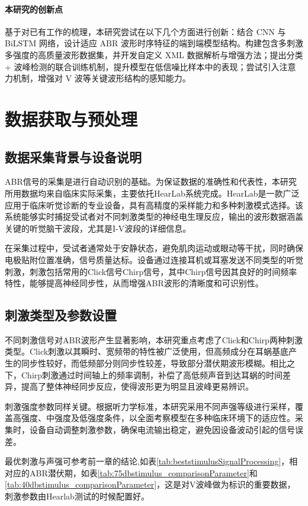 \paragraph*{本研究的创新点}
基于对已有工作的梳理，本研究尝试在以下几个方面进行创新：结合 CNN 与 BiLSTM 网络，设计适应 ABR 波形时序特征的端到端模型结构。构建包含多刺激多强度的高质量波形数据集，并开发自定义 XML 数据解析与增强方法；提出分类 + 波峰检测的联合训练机制，提升模型在低信噪比样本中的表现；尝试引入注意力机制，增强对 V 波等关键波形结构的感知能力。

\section{数据获取与预处理}
\subsection*{数据采集背景与设备说明}
ABR信号的采集是进行自动识别的基础。为保证数据的准确性和代表性，本研究所用数据均来自临床实际采集，主要依托HearLab系统完成。HearLab是一款广泛应用于临床听觉诊断的专业设备，具有高精度的采样能力和多种刺激模式选择。该系统能够实时捕捉受试者对不同刺激类型的神经电生理反应，输出的波形数据涵盖关键的听觉脑干波段，尤其是I-V波段的详细信息。

在采集过程中，受试者通常处于安静状态，避免肌肉运动或眼动等干扰，同时确保电极贴附位置准确，信号质量达标。设备通过连接耳机或耳塞发送不同类型的听觉刺激，刺激包括常用的Click信号Chirp信号，其中Chirp信号因其良好的时间频率特性，能够提高神经同步性，从而增强ABR波形的清晰度和可识别性。


\subsection*{刺激类型及参数设置}
不同刺激信号对ABR波形产生显著影响，本研究重点考虑了Click和Chirp两种刺激类型。Click刺激以其瞬时、宽频带的特性被广泛使用，但高频成分在耳蜗基底产生的同步性较好，而低频部分则同步性较差，导致部分潜伏期波形模糊。相比之下，Chirp刺激通过时间轴上的频率调制，补偿了高低频声音到达耳蜗的时间差异，提高了整体神经同步反应，使得波形更为明显且波峰更易辨识。

刺激强度参数同样关键。根据听力学标准，本研究采用不同声强等级进行采样，覆盖高强度、中强度及低强度条件，以全面考察模型在多种临床环境下的适应性。采集时，设备自动调整刺激参数，确保电流输出稳定，避免因设备波动引起的信号误差。

最优刺激与声强可参考前一章的结论,如表\ref{tab:beststimulusSignalProcessing}，相对应的ABR潜伏期，如表\ref{tab:75dbstimulus_comparisonParameter}和\ref{tab:40dbstimulus_comparisonParameter}，这是对V波峰做为标识的重要数据，刺激参数由Hearlab测试的时候配置好。
